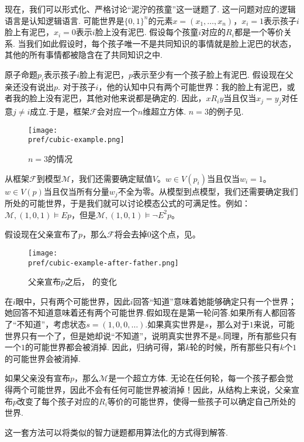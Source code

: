 现在，我们可以形式化、严格讨论“泥泞的孩童”这一谜题了. 这一问题对应的逻辑语言是认知逻辑语言. 可能世界是$\{0,1\}^n$的元素$x=(x_1,\dots,x_n)$，$x_i=1$表示孩子$i$脸上有泥巴，$x_i=0$表示$i$脸上没有泥巴. 假设每个孩童$i$对应的$R_i$都是一个等价关系. 当我们如此假设时，每个孩子唯一不是共同知识的事情就是脸上泥巴的状态，其他的所有事情都被隐含在了共同知识之中.

原子命题$p_i$表示孩子$i$脸上有泥巴，$p$表示至少有一个孩子脸上有泥巴. 假设现在父亲还没有说出$p$. 对于孩子$i$，他的认知中只有两个可能世界：我的脸上有泥巴，或者我的脸上没有泥巴，其他对他来说都是确定的. 因此，$x R_i y$当且仅当$x_j=y_j$对任意$j\neq i$成立.于是，框架$\mathcal F$会对应一个$n$维超立方体. $n=3$的例子见.

\begin{figure}[ht]
    \centering
    \texttt{[image: \\pref/cubic-example.png]}
    \caption{$n=3$的情况}
    \label{fig:cubic-example}
\end{figure}

从框架$\mathcal F$到模型$\mathcal M$，我们还需要确定赋值$V$。$w\in V(p_i)$当且仅当$w_i=1$。$w\in V(p)$当且仅当所有分量$w_j$不全为零。从模型到点模型，我们还需要确定我们所处的可能世界，于是我们就可以讨论模态公式的可满足性。例如：$\mathcal M,(1,0,1)\vDash Ep$，但是$\mathcal M,(1,0,1)\vDash \neg E^2p$。

假设现在父亲宣布了$p$，那么$\mathcal F$将会去掉$0$这个点，见。
\begin{figure}[ht]
    \centering
    \texttt{[image: \\pref/cubic-example-after-father.png]}
    \caption{父亲宣布$p$之后， 的变化}
    \label{fig:cubic-example-after-father}
\end{figure}


 在$i$眼中，只有两个可能世界，因此$i$回答“知道”意味着她能够确定只有一个世界；她回答不知道意味着还有两个可能世界.假如现在是第一轮问答.如果所有人都回答了“不知道”，考虑状态$s=(1,0,0,\dots)$.如果真实世界是$s$，那么对于$1$来说，可能世界只有一个了，但是她却说“不知道”，说明真实世界不是$s$.同理，所有那些只有一个$1$的可能世界都会被消掉. 因此，归纳可得，第$k$轮的时候，所有那些只有$k$个$1$的可能世界会被消掉.
 
 如果父亲没有宣布$p$，那么$\mathcal M$是一个超立方体. 无论在任何轮，每一个孩子都会觉得两个可能世界，因此不会有任何可能世界被消掉！因此，从结构上来说，父亲宣布$p$改变了每个孩子对应的$R_i$等价的可能世界，使得一些孩子可以确定自己所处的世界. 
 
这一套方法可以将类似的智力谜题都用算法化的方式得到解答.

